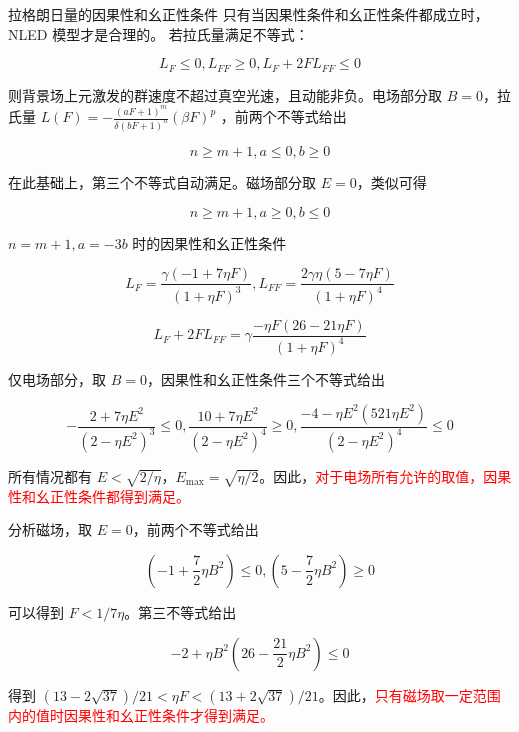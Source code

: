 \documentclass[9pt, dvipsnames]{beamer} %
\begin{document}
\begin{frame}{拉格朗日量的因果性和幺正性条件}
    只有当因果性条件和幺正性条件都成立时，NLED 模型才是合理的。
    若拉氏量满足不等式：

    $$
    \boxed{
    L_F \leqslant 0,
    L_{FF}\geqslant 0,
    L_F + 2F L_{FF} \leqslant 0
    }
    $$
    
    则背景场上元激发的群速度不超过真空光速，且动能非负。电场部分取 $B=0 $，拉氏量 $\displaystyle{L(F)=-\frac{\left(aF+1 \right)^m }{\delta(bF+1)^n } \left(\beta F \right)^p }$ ，前两个不等式给出
    
    $$
    n\geqslant m+1,a\leqslant 0,b\geqslant 0
    $$
    
    在此基础上，第三个不等式自动满足。磁场部分取 $E=0 $，类似可得
    
    $$
    n\geqslant m+1,a\geqslant 0,b\leqslant 0
    $$
    
    $n=m+1,a=-3b $ 时的因果性和幺正性条件
    
    $$
    L_F
    =\frac{\gamma\left(-1+7\eta F \right) }{\left(1+\eta F \right)^3 },
    L_{FF}
    =\frac{2\gamma \eta\left(5-7\eta F \right) }{\left(1+\eta F \right)^4 } 
    $$
    
    $$
    L_F + 2FL_{FF} 
    =\gamma \frac{-\eta F\left(26-21\eta F \right) }{\left(1+\eta F \right)^4 }
    $$
\end{frame}

\begin{frame}
    仅电场部分，取 $B=0 $，因果性和幺正性条件三个不等式给出
    
    $$
    -\frac{2+7\eta E^2 }{\left(2-\eta E^2 \right)^3 } \leqslant 0,
    \frac{10+7\eta E^2 }{\left(2-\eta E^2 \right)^4 } \geqslant 0,
    \frac{-4-\eta E^2\left(521\eta E^2 \right) }{\left(2-\eta E^2 \right)^4 } \leqslant 0
    $$
    
    
    所有情况都有 $E<\sqrt{2/\eta} $，$E_{\max}=\sqrt{\eta/2} $。因此，\textcolor{red}{对于电场所有允许的取值，因果性和幺正性条件都得到满足。}
    
    分析磁场，取 $E=0 $，前两个不等式给出
    
    $$
    \left(-1+\frac{7 }{2 } \eta B^2 \right)\leqslant 0,
    \left(5-\frac{7 }{2 } \eta B^2 \right)\geqslant 0
    $$
    
    可以得到 $F<1/7\eta $。第三不等式给出
    
    $$
    -2+\eta B^2\left(26-\frac{21 }{2 } \eta B^2 \right)\leqslant 0
    $$
    
    得到 $(13-2\sqrt{37})/21<\eta F<(13+2\sqrt{37})/21 $。因此，\textcolor{red}{只有磁场取一定范围内的值时因果性和幺正性条件才得到满足。}
\end{frame}
\end{document}

